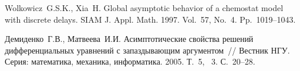 %

\begin{thebibliography}{9} %
Wolkowicz~G.S.K., Xia~H.
Global asymptotic behavior of a chemostat model with discrete delays.
SIAM J. Appl. Math. 1997. Vol.~57, No.~4. Pp.~1019--1043.

Демиденко~Г.В., Матвеева~И.И.
Асимптотические свойства решений дифференциальных уравнений с запаздывающим аргументом~//
Вестник НГУ. Серия: математика, механика, информатика. 2005. Т.~5, \textnumero~3. С.~20--28.

\end{thebibliography}




%

